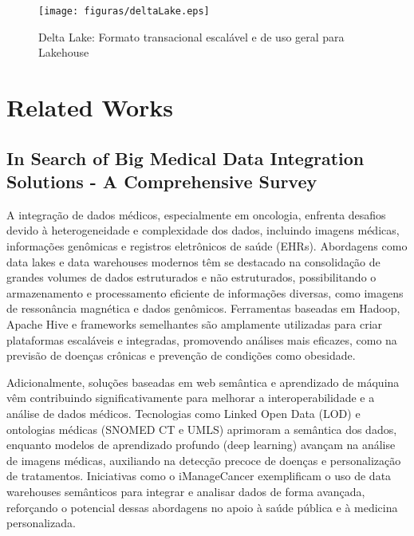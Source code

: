 \begin{figure}[H]
    \centering
    \texttt{[image: figuras/deltaLake.eps]}
    \caption{Delta Lake: Formato transacional escalável e de uso geral para Lakehouse}
    \cite{lee2024delta}
    \label{fig:pipeline_proc}
\end{figure}

\section{Related Works}
\subsection{In Search of Big Medical Data Integration Solutions - A Comprehensive Survey}
A integração de dados médicos, especialmente em oncologia, enfrenta desafios devido à heterogeneidade e complexidade dos dados, 
incluindo imagens médicas, informações genômicas e registros eletrônicos de saúde (EHRs). Abordagens como data lakes e data 
warehouses modernos têm se destacado na consolidação de grandes volumes de dados estruturados e não estruturados, possibilitando o
 armazenamento e processamento eficiente de informações diversas, como imagens de ressonância magnética e dados genômicos. Ferramentas 
 baseadas em Hadoop, Apache Hive e frameworks semelhantes são amplamente utilizadas para criar plataformas escaláveis e integradas, 
 promovendo análises mais eficazes, como na previsão de doenças crônicas e prevenção de condições como obesidade. \cite{dhayne2019}

Adicionalmente, soluções baseadas em web semântica e aprendizado de máquina vêm contribuindo significativamente para melhorar a 
interoperabilidade e a análise de dados médicos. Tecnologias como Linked Open Data (LOD) e ontologias médicas (SNOMED CT e UMLS) 
aprimoram a semântica dos dados, enquanto modelos de aprendizado profundo (deep learning) avançam na análise de imagens médicas, 
auxiliando na detecção precoce de doenças e personalização de tratamentos. Iniciativas como o iManageCancer exemplificam o uso de 
data warehouses semânticos para integrar e analisar dados de forma avançada, reforçando o potencial dessas abordagens no apoio à 
saúde pública e à medicina personalizada. \cite{dhayne2019}

